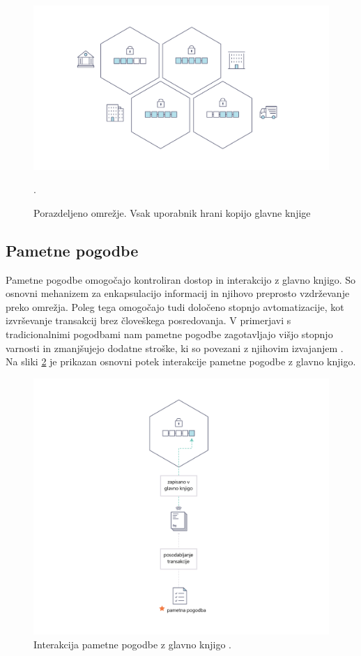 \documentclass[a4paper, 12pt]{book}
\begin{document}
\begin{figure}[h]
	\includegraphics[width=1.0\textwidth]{slike/basic_network.png}
	\caption{Porazdeljeno omrežje. Vsak uporabnik hrani kopijo glavne knjige \cite{hyperledgerDocs}}.
	\label{hyperledger_basic_network}
\end{figure}

\subsection{Pametne pogodbe}
Pametne pogodbe omogočajo kontroliran dostop in interakcijo z glavno knjigo.
So osnovni mehanizem za enkapsulacijo informacij in njihovo preprosto vzdrževanje preko omrežja.
Poleg tega omogočajo tudi določeno stopnjo avtomatizacije, kot izvrševanje transakcij brez človeškega posredovanja.
V primerjavi s tradicionalnimi pogodbami nam pametne pogodbe zagotavljajo višjo stopnjo varnosti in zmanjšujejo dodatne stroške, ki so povezani z njihovim izvajanjem \cite{atzei2017survey}.
Na sliki \ref{smart_contract} je prikazan osnovni potek interakcije pametne pogodbe z glavno knjigo.

\begin{figure}[h]
	\includegraphics[width=1.0\textwidth]{slike/Smart_Contract_sl.png}
	\caption{Interakcija pametne pogodbe z glavno knjigo \cite{hyperledgerDocs}.}
	\label{smart_contract}
\end{figure}
\end{document}
